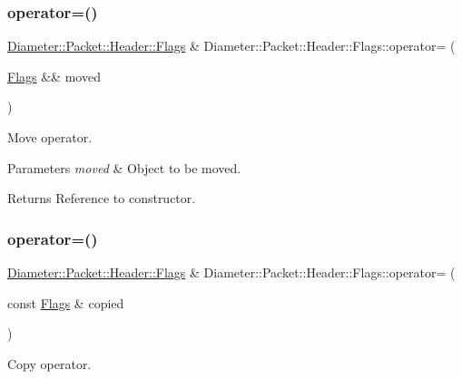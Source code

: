 \subsubsection{\texorpdfstring{operator=()}{operator=()}\hspace{0.1cm}{\footnotesize\ttfamily [1/2]}}
{\footnotesize\ttfamily \hyperlink{classDiameter_1_1Packet_1_1Header_1_1Flags}{Diameter\+::\+Packet\+::\+Header\+::\+Flags} \& Diameter\+::\+Packet\+::\+Header\+::\+Flags\+::operator= (\begin{DoxyParamCaption}\item[{\hyperlink{classDiameter_1_1Packet_1_1Header_1_1Flags}{Flags} \&\&}]{moved }\end{DoxyParamCaption})\hspace{0.3cm}{\ttfamily [noexcept]}}



Move operator. 


\begin{DoxyParams}{Parameters}
{\em moved} & Object to be moved. \\
\hline
\end{DoxyParams}
\begin{DoxyReturn}{Returns}
Reference to constructor. 
\end{DoxyReturn}
\mbox{\label{classDiameter_1_1Packet_1_1Header_1_1Flags_ad83a50d504d49462093a515681b0d7b6}} 
\subsubsection{\texorpdfstring{operator=()}{operator=()}\hspace{0.1cm}{\footnotesize\ttfamily [2/2]}}
{\footnotesize\ttfamily \hyperlink{classDiameter_1_1Packet_1_1Header_1_1Flags}{Diameter\+::\+Packet\+::\+Header\+::\+Flags} \& Diameter\+::\+Packet\+::\+Header\+::\+Flags\+::operator= (\begin{DoxyParamCaption}\item[{const \hyperlink{classDiameter_1_1Packet_1_1Header_1_1Flags}{Flags} \&}]{copied }\end{DoxyParamCaption})}



Copy operator. 


